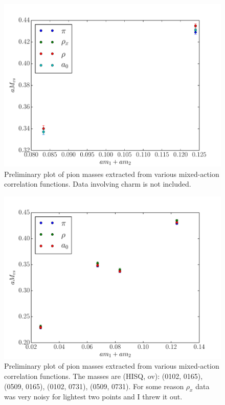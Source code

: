 \documentclass[11pt,a4paper]{article}
\begin{document}
\begin{figure}[h]
 \centering
 \includegraphics[width=.8\textwidth]{mixed_mpi.pdf}
 \caption{Preliminary plot of pion masses extracted from various mixed-action
 correlation functions.  Data involving charm is not included.}
\end{figure}

\begin{figure}[h]
 \centering
 \includegraphics[width=.8\textwidth]{mixed_mpi2.pdf}
 \caption{Preliminary plot of pion masses extracted from various mixed-action
 correlation functions. 
 The masses are (HISQ, ov): (0102, 0165), (0509, 0165), (0102, 0731), (0509, 0731).
 For some reason $\rho_x$ data was very noisy for lightest
 two points and I threw it out.}
\end{figure}

\clearpage

\end{document}
